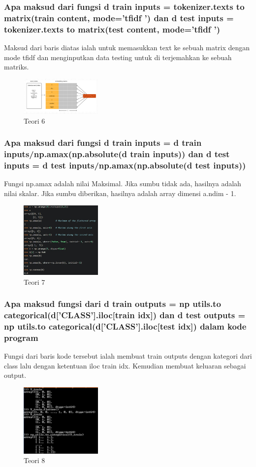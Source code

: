 \subsubsection{Apa maksud dari fungsi d train inputs = tokenizer.texts to matrix(train content, mode=’tfidf ’) dan d test inputs = tokenizer.texts to matrix(test content, mode=’tfidf ’)}
\hfill\break
Maksud dari baris diatas ialah untuk memasukkan text ke sebuah matrix dengan mode tfidf dan menginputkan data testing untuk di terjemahkan ke sebuah matriks.
\begin{figure}[H]
\centering
	\includegraphics[width=4cm]{figures/1174066/7/6.jpg}
\caption{Teori 6}
\end{figure}

\subsubsection{Apa maksud dari fungsi d train inputs = d train inputs/np.amax(np.absolute(d train inputs)) dan d test inputs = d test inputs/np.amax(np.absolute(d test inputs))}
\hfill\break
Fungsi np.amax adalah nilai Maksimal. Jika sumbu tidak ada, hasilnya adalah nilai skalar. Jika sumbu diberikan, hasilnya adalah array dimensi a.ndim - 1.
\begin{figure}[H]
\centering
	\includegraphics[width=4cm]{figures/1174066/7/7.jpg}
\caption{Teori 7}
\end{figure}

\subsubsection{Apa maksud fungsi dari d train outputs = np utils.to categorical(d[’CLASS’].iloc[train idx]) dan d test outputs = np utils.to categorical(d[’CLASS’].iloc[test idx]) dalam kode program}
\hfill\break
Fungsi dari baris kode tersebut ialah membuat train outputs dengan kategori dari class lalu dengan ketentuan iloc train idx. Kemudian membuat keluaran sebagai output.
\begin{figure}[H]
\centering
	\includegraphics[width=4cm]{figures/1174066/7/8.jpg}
\caption{Teori 8}
\end{figure}

